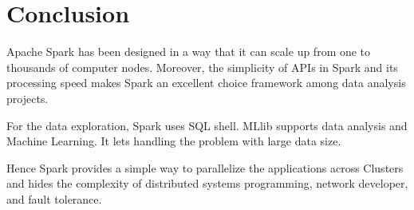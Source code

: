 \section{Conclusion}
\label{sec:conclusion}

Apache Spark has been designed in a way that it can scale up from one to thousands of computer nodes. 
Moreover, the simplicity of APIs in Spark and its processing speed makes Spark an excellent choice framework among data analysis projects. 

For the data exploration, Spark uses SQL shell. MLlib supports data analysis and Machine Learning. It lets handling the problem with large data size.

Hence Spark provides a simple way to parallelize the applications across Clusters and hides the complexity of distributed systems programming, network developer, and fault tolerance.